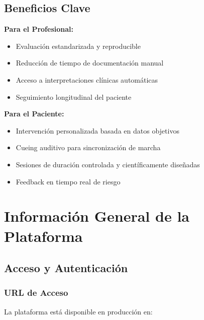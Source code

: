 \documentclass[12pt,a4paper,spanish,oneside]{book}
\begin{document}
\section{Beneficios Clave}

\begin{conceptobox}
  \textbf{Para el Profesional:}
  \begin{itemize}
    \item Evaluación estandarizada y reproducible
    \item Reducción de tiempo de documentación manual
    \item Acceso a interpretaciones clínicas automáticas
    \item Seguimiento longitudinal del paciente
  \end{itemize}
  
  \textbf{Para el Paciente:}
  \begin{itemize}
    \item Intervención personalizada basada en datos objetivos
    \item Cueing auditivo para sincronización de marcha
    \item Sesiones de duración controlada y científicamente diseñadas
    \item Feedback en tiempo real de riesgo
  \end{itemize}
\end{conceptobox}

\chapter{Información General de la Plataforma}

\section{Acceso y Autenticación}

\subsection{URL de Acceso}

La plataforma está disponible en producción en:

\begin{center}
\end{center}
\end{document}
